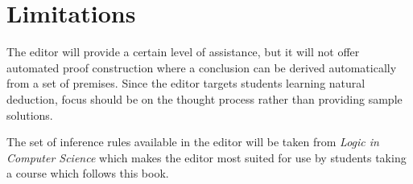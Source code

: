 \section{Limitations}

The editor will provide a certain level of assistance, but it will not offer automated proof construction where a conclusion can be derived automatically from a set of premises. Since the editor targets students learning natural deduction, focus should be on the thought process rather than providing sample solutions.

The set of inference rules available in the editor will be taken from \textit{Logic in Computer Science} \cite{huth_ryan_2018} which makes the editor most suited for use by students taking a course which follows this book.